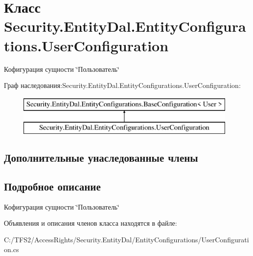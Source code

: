 \hypertarget{class_security_1_1_entity_dal_1_1_entity_configurations_1_1_user_configuration}{}\section{Класс Security.\+Entity\+Dal.\+Entity\+Configurations.\+User\+Configuration}
\label{class_security_1_1_entity_dal_1_1_entity_configurations_1_1_user_configuration}


Кофигурация сущности \char`\"{}Пользователь\char`\"{}  


Граф наследования\+:Security.\+Entity\+Dal.\+Entity\+Configurations.\+User\+Configuration\+:\begin{figure}[H]
\begin{center}
\leavevmode
\includegraphics[height=2.000000cm]{d7/da5/class_security_1_1_entity_dal_1_1_entity_configurations_1_1_user_configuration}
\end{center}
\end{figure}
\subsection*{Дополнительные унаследованные члены}


\subsection{Подробное описание}
Кофигурация сущности \char`\"{}Пользователь\char`\"{} 



Объявления и описания членов класса находятся в файле\+:\begin{DoxyCompactItemize}
\item 
C\+:/\+T\+F\+S2/\+Access\+Rights/\+Security.\+Entity\+Dal/\+Entity\+Configurations/User\+Configuration.\+cs\end{DoxyCompactItemize}
